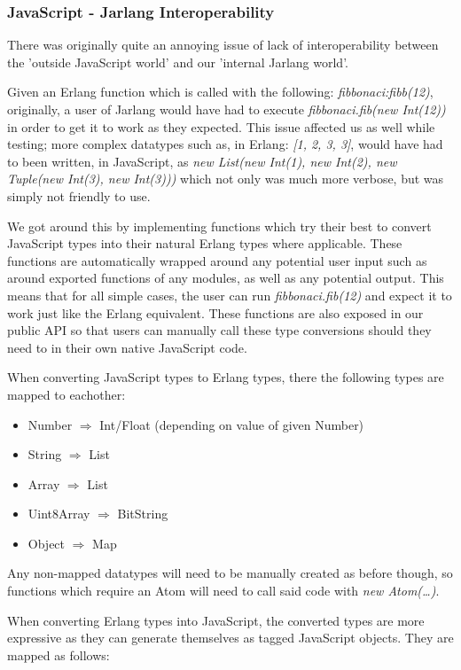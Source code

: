 \documentclass[twoside,12pt,titlepage,a4paper]{article}
\begin{document}
\subsubsection{JavaScript - Jarlang Interoperability}
There was originally quite an annoying issue of lack of interoperability between the 'outside JavaScript world' and our 'internal Jarlang world'. 

Given an Erlang function which is called with the following: \textit{fibbonaci:fibb(12)}, originally, a user of Jarlang would have had to execute \textit{fibbonaci.fib(new Int(12))} in order to get it to work as they expected. This issue affected us as well while testing; more complex datatypes such as, in Erlang: \textit{[1, 2, {3, 3}]}, would have had to been written, in JavaScript, as \textit{new List(new Int(1), new Int(2), new Tuple(new Int(3), new Int(3)))} which not only was much more verbose, but was simply not friendly to use.

We got around this by implementing functions which try their best to convert JavaScript types into their natural Erlang types where applicable. These functions are automatically wrapped around any potential user input such as around exported functions of any modules, as well as any potential output. This means that for all simple cases, the user can run \textit{fibbonaci.fib(12)} and expect it to work just like the Erlang equivalent. These functions are also exposed in our public API so that users can manually call these type conversions should they need to in their own native JavaScript code.

When converting JavaScript types to Erlang types, there the following types are mapped to eachother:

\begin{itemize}
\item Number $\Rightarrow$ Int/Float (depending on value of given Number)
\item String $\Rightarrow$ List
\item Array $\Rightarrow$ List
\item Uint8Array $\Rightarrow$ BitString
\item Object $\Rightarrow$ Map
\end{itemize}

Any non-mapped datatypes will need to be manually created as before though, so functions which require an Atom will need to call said code with \textit{new Atom(\dots)}.

When converting Erlang types into JavaScript, the converted types are more expressive as they can generate themselves as tagged JavaScript objects. They are mapped as follows:
\end{document}
